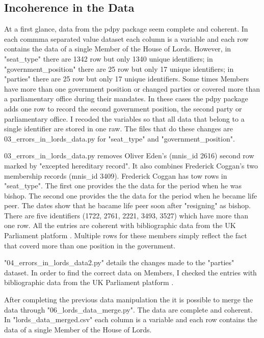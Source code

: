 \subsection{Incoherence in the Data}
At a first glance, data from the pdpy package seem complete and coherent. In each commma separated value dataset each column is a variable and each row contains the data of a single Member of the House of Lords. However, in "seat\_type" there are 1342 row but only 1340 unique identifiers; in "government\_position" there are 25 row but only 17 unique identifiers; in "parties" there are 25 row but only 17 unique identifiers. %
Some times Members have more than one government position or changed parties or covered more than a parliamentary office during their mandates. In these cases the pdpy package adds one row to record the second government position, the second party or parliamentary office. I recoded the variables so that all data that belong to a single identifier are stored in one raw. The files that do these changes are 03\_errors\_in\_lords\_data.py for "seat\_type" and "government\_position".

03\_errors\_in\_lords\_data.py removes Oliver Eden's (mnis\_id 2616) second row marked by "excepted hereditary record". It also combines Frederick Coggan's two membership records (mnis\_id 3409). Frederick Coggan has tow rows in "seat\_type". The first one provides the the data for the period when he was bishop. The second one provides the the data for the period when he became life peer. The dates show that he bacame life peer soon after "resigning" as bishop. There are five identifiers (1722, 2761, 2221, 3493, 3527) which have more than one row. All the entries are coherent with bibliographic data from the UK Parliament platform \textcite{MPsLordsUK}. Multiple rows for these members simply reflect the fact that coverd more than one position in the government.

"04\_errors\_in\_lords\_data2.py" details the changes made to the "parties" dataset. In order to find the correct data on Members, I checked the entries with bibliographic data from the UK Parliament platform \textcite{MPsLordsUK}.

After completing the previous data manipulation the it is possible to merge the data through "06\_lords\_data\_merge.py".
The data are complete and coherent. In "lords\_data\_merged.csv" each column is a variable and each row contains the data of a single Member of the House of Lords.

